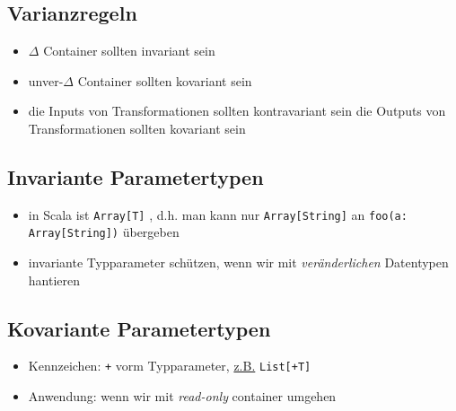 \subsection{Varianzregeln}
\begin{itemize}
  \item $\Delta$ Container sollten invariant sein
  \item unver-$\Delta$ Container sollten kovariant sein
  \item die Inputs von Transformationen sollten kontravariant sein
  \und die Outputs von Transformationen sollten kovariant sein
\end{itemize}
  

\subsection{Invariante Parametertypen}
\begin{itemize}
  \item in Scala ist \texttt{Array[T]} , d.h. 
  man kann nur \texttt{Array[String]} an \texttt{foo(a: Array[String])}
  übergeben
  \item invariante Typparameter schützen, wenn wir mit
  \textit{veränderlichen} Datentypen hantieren
\end{itemize}


\subsection{Kovariante Parametertypen}
\begin{itemize}
  \item Kennzeichen: \texttt{+} vorm Typparameter, \uline{z.B.} 
  \texttt{List[+T]}
  \item Anwendung: wenn wir mit \textit{read-only} container umgehen
  
  
\end{itemize}



\begin{comment}
\begin{itemize}
  \item http://www.scala-ide.org/ | Plugin für Eclipse
  \item 
  \item n
\end{itemize}
\end{comment}
%
\begin{comment}
\addcontentsline{toc}{section}{Literatur}


\end{comment}

